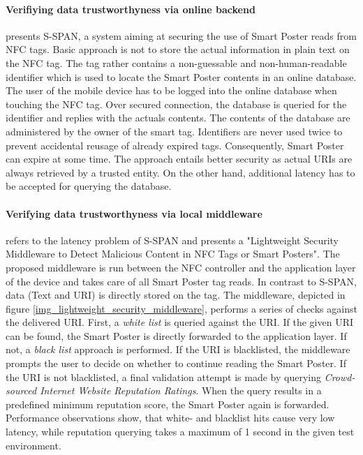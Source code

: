 \documentclass[12pt,a4paper]{article}
\begin{document}
\paragraph{Verifiying data trustworthyness via online backend}
\cite{DBLP:conf/wowmom/WuQKKT12} presents S-SPAN, a system aiming at securing the use of Smart Poster reads from NFC tags. Basic approach is not to store the actual information in plain text on the NFC tag. The tag rather contains a non-guessable and non-human-readable identifier which is used to locate the Smart Poster contents in an online database. The user of the mobile device has to be logged into the online database when touching the NFC tag. Over secured connection, the database is queried for the identifier and replies with the actuals contents. The contents of the database are administered by the owner of the smart tag. Identifiers are never used twice to prevent accidental reusage of already expired tags. Consequently, Smart Poster can expire at some time. The approach entails better security as actual URIs are always retrieved by a trusted entity. On the other hand, additional latency has to be accepted for querying the database.

\paragraph{Verifying data trustworthyness via local middleware}
\cite{DBLP:conf/trustcom/HameedHHK14} refers to the latency problem of S-SPAN and presents a "Lightweight Security Middleware to Detect Malicious Content in NFC Tags or Smart Posters". The proposed middleware is run between the NFC controller and the application layer of the device and takes care of all Smart Poster tag reads. In contrast to S-SPAN, data (Text and URI) is directly stored on the tag. The middleware, depicted in figure \ref{img_lightweight_security_middleware}, performs a series of checks against the delivered URI. First, a \emph{white list} is queried against the URI. If the given URI can be found, the Smart Poster is directly forwarded to the application layer. If not, a \emph{black list} approach is performed. If the URI is blacklisted, the middleware prompts the user to decide on whether to continue reading the Smart Poster. If the URI is not blacklisted, a final validation attempt is made by querying \emph{Crowd-sourced Internet Website Reputation Ratings}. When the query results in a predefined minimum reputation score, the Smart Poster again is forwarded. Performance observations show, that white- and blacklist hits cause very low latency, while reputation querying takes a maximum of 1 second in the given test environment.
\end{document}
